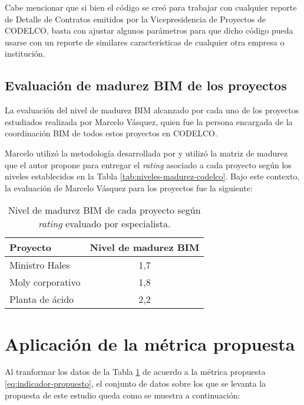 Cabe mencionar que si bien el código se creó para trabajar con cualquier reporte de Detalle de Contratos emitidos por la Vicepresidencia de Proyectos de CODELCO, basta con ajustar algunos parámetros para que dicho código pueda usarse con un reporte de similares características de cualquier otra empresa o institución.


\subsection{Evaluación de madurez BIM de los proyectos}

La evaluación del nivel de madurez BIM alcanzado por cada uno de los proyectos estudiados realizada por Marcelo Vásquez, quien fue la persona encargada de la coordinación BIM de todos estos proyectos en CODELCO.

Marcelo utilizó la metodología desarrollada por  y utilizó la matriz de madurez que el autor propone para entregar el \emph{rating} asociado a cada proyecto según los niveles establecidos en la Tabla \ref{tab:niveles-madurez-codelco}. Bajo este contexto, la evaluación de Marcelo Vásquez para los proyectos fue la siguiente:

\begin{table}[H]
    \centering
    \caption{Nivel de madurez BIM de cada proyecto según \emph{rating} evaluado por especialista.}
    \label{tab:evaluacionmadurez}
    \begin{tabular}{lc}
        \toprule 
        \textbf{Proyecto} & \textbf{Nivel de madurez BIM} \\
        \midrule
        Ministro Hales   & 1,7 \\
        Moly corporativo & 1,8 \\
        Planta de ácido  & 2,2 \\
        \bottomrule
    \end{tabular}
\end{table}

\section{Aplicación de la métrica propuesta}

Al tranformar los datos de la Tabla \ref{tab:evaluacionmadurez} de acuerdo a la métrica propuesta \eqref{eq:indicador-propuesto}, el conjunto de datos sobre los que se levanta la propuesta de este estudio queda como se muestra a continuación:

